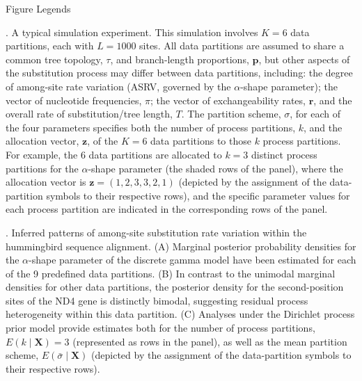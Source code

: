 \documentclass[11pt]{article}
\begin{document}
\newpage

\begin{center}
{\sc Figure Legends}
\end{center}

{\fontsize{10}{10}\selectfont
{}. A typical simulation experiment.  This simulation involves $K = 6$ data partitions, each with $L = 1000$ sites. All data partitions are assumed to share a common tree topology, $\tau$, and branch-length proportions, ${\mathbf p}$, but other aspects of the substitution process may differ between data partitions, including: the degree of among-site rate variation (ASRV, governed by the $\alpha$-shape parameter); the vector of nucleotide frequencies, \mbox{\boldmath$\pi$\unboldmath}; the vector of exchangeability rates, ${\mathbf r}$, and the overall rate of substitution/tree length, $T$.  The partition scheme, $\sigma$, for each of the four parameters specifies both the number of process partitions, $k$, and the allocation vector, ${\mathbf z}$, of the $K = 6$ data partitions to those $k$ process partitions. For example, the 6 data partitions are allocated to $k = 3$ distinct process partitions for the $\alpha$-shape parameter (the shaded rows of the panel), where the allocation vector is ${\mathbf z}  = (1,2,3,3,2,1)$ (depicted by the assignment of the data-partition symbols to their respective rows), and the specific parameter values for each process partition are indicated in the corresponding rows of the panel.

\bigskip

. Inferred patterns of among-site substitution rate variation within the hummingbird sequence alignment.  (A) Marginal posterior probability densities for the $\alpha$-shape parameter of the discrete gamma model have been estimated for each of the 9 predefined data partitions.  (B) In contrast to the unimodal marginal densities for other data partitions, the posterior density for the second-position sites of the ND4 gene is distinctly bimodal, suggesting residual process heterogeneity within this data partition.  (C) Analyses under the Dirichlet process prior model provide estimates both for the number of process partitions, $E(k \mid \mathbf{X}) = 3$ (represented as rows in the panel), as well as the mean partition scheme, $E(\bar{\sigma} \mid \mathbf{X})$ (depicted by the assignment of the data-partition symbols to their respective rows).

\bigskip

}
\end{document}
